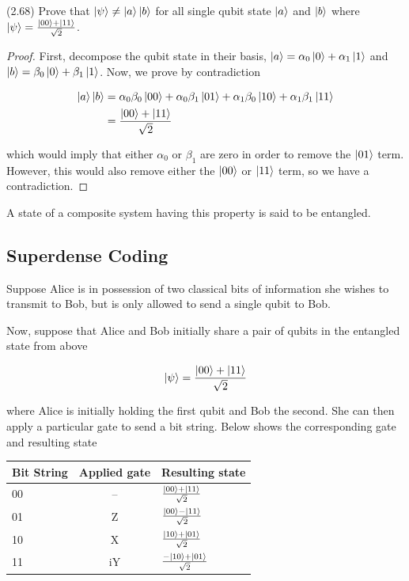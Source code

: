 \documentclass[main.tex]{subfiles}
\begin{document}
\begin{subappendices}
\begin{exercise}
(2.68) Prove that $\ket{\psi} \neq \ket{a}\ket{b}$ for all single qubit state $\ket{a}$ and $\ket{b}$ where $\ket{\psi} = \frac{\ket{00} + \ket{11}}{\sqrt{2}}$.
\end{exercise}

\begin{proof}
	First, decompose the qubit state in their basis, $\ket{a} = \alpha_0 \ket{0} + \alpha_1 \ket{1}$ and $\ket{b} = \beta_0 \ket{0} + \beta_1 \ket{1}$. Now, we prove by contradiction
	
	\begin{align*}
	\ket{a}\ket{b} &= \alpha_0\beta_0 \ket{00} + \alpha_0\beta_1 \ket{01} + \alpha_1\beta_0 \ket{10} + \alpha_1\beta_1 \ket{11} \\
	&= \frac{\ket{00} + \ket{11}}{\sqrt{2}}
	\end{align*}

which would imply that either $\alpha_0$ or $\beta_1$ are zero in order to remove the $\ket{01}$ term. However, this would also remove either the $\ket{00}$ or $\ket{11}$ term, so we have a contradiction.
\end{proof}

A state of a composite system having this property is said to be entangled. 

\subsection{Superdense Coding}

Suppose Alice is in possession of two classical bits of information she wishes to transmit to Bob, but is only allowed to send a single qubit to Bob.

 Now, suppose that Alice and Bob initially share a pair of qubits in the entangled state from above
 
\begin{align*}
\ket{\psi} = \frac{\ket{00} + \ket{11}}{\sqrt{2}}	
\end{align*}
 
 where Alice is initially holding the first qubit and Bob the second. She can then apply a particular gate to send a bit string. Below shows the corresponding gate and resulting state
 
 \begin{table}[H]
 	\begin{center}
 \begin{tabular}{l | c | l }
 	Bit String & Applied gate  & Resulting state\\
 	\hline 
 	00 & -- & $\frac{\ket{00} + \ket{11}}{\sqrt{2}}$\\
 	01 & Z & $\frac{\ket{00} - \ket{11}}{\sqrt{2}}$\\
 	10 & X & $\frac{\ket{10} + \ket{01}}{\sqrt{2}}$\\
 	11 & iY & $\frac{-\ket{10} + \ket{01}}{\sqrt{2}}$
 \end{tabular}
 \end{center}
 \end{table}


\end{subappendices}
\end{document}
